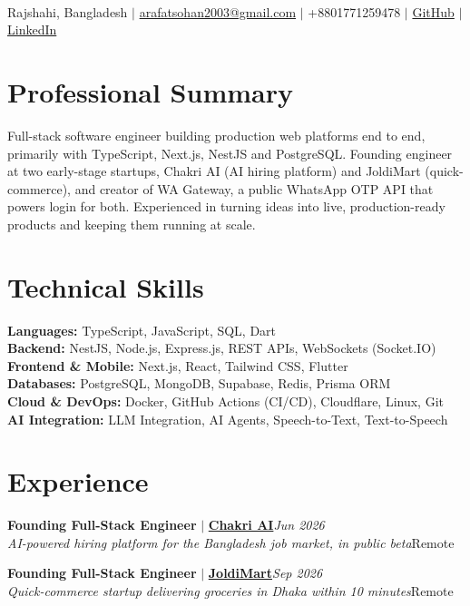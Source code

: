 \documentclass[11pt,a4paper]{article}
\newcommand{\rlink}[2]{\href{#1}{\textcolor{linkblue}{#2}}}
\newcommand{\role}[4]{%
  \textbf{Founding Full-Stack Engineer} $|$ \textbf{#1}\hfill\textit{#2}\\
  \textit{#3}\hfill #4\par\vspace{6pt}}
\begin{document}
\begin{center}
  {\LARGE\bfseries{}}\\[4pt]
  Rajshahi, Bangladesh $|$ \rlink{mailto:arafatsohan2003@gmail.com}{arafatsohan2003@gmail.com} $|$ +8801771259478 $|$ \rlink{https://github.com/ars2k03}{GitHub} $|$ \rlink{https://www.linkedin.com/in/ars2k05}{LinkedIn}
\end{center}

\section{Professional Summary}
Full-stack software engineer building production web platforms end to end, primarily with TypeScript, Next.js, NestJS and PostgreSQL. Founding engineer at two early-stage startups, Chakri AI (AI hiring platform) and JoldiMart (quick-commerce), and creator of WA Gateway, a public WhatsApp OTP API that powers login for both. Experienced in turning ideas into live, production-ready products and keeping them running at scale.

\section{Technical Skills}
\textbf{Languages:} TypeScript, JavaScript, SQL, Dart\\
\textbf{Backend:} NestJS, Node.js, Express.js, REST APIs, WebSockets (Socket.IO)\\
\textbf{Frontend \& Mobile:} Next.js, React, Tailwind CSS, Flutter\\
\textbf{Databases:} PostgreSQL, MongoDB, Supabase, Redis, Prisma ORM\\
\textbf{Cloud \& DevOps:} Docker, GitHub Actions (CI/CD), Cloudflare, Linux, Git\\
\textbf{AI Integration:} LLM Integration, AI Agents, Speech-to-Text, Text-to-Speech

\section{Experience}
\role{\rlink{https://chakriai.com}{Chakri AI}}{Jun 2026}{AI-powered hiring platform for the Bangladesh job market, in public beta}{Remote}
\role{\rlink{https://joldimart.com}{JoldiMart}}{Sep 2026}{Quick-commerce startup delivering groceries in Dhaka within 10 minutes}{Remote}
\end{document}
